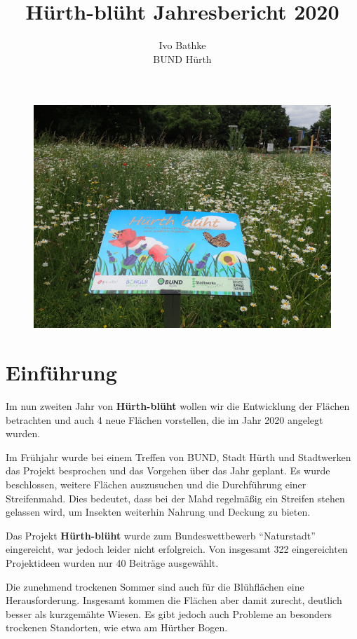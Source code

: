 \documentclass[10pt]{article}
\title{\textbf{Hürth-blüht Jahresbericht 2020}}
\author{Ivo Bathke\\
		BUND Hürth\\}
\date{}
\begin{document}
\maketitle

\begin{figure}[h!]
  \includegraphics[width=\linewidth]{img/titel.jpg}
\end{figure}

\newpage

\section{Einführung}
Im nun zweiten Jahr von \textbf{Hürth-blüht} wollen wir die Entwicklung der Flächen betrachten und auch 4 neue Flächen vorstellen, die im Jahr 2020 angelegt wurden.


Im Frühjahr wurde bei einem Treffen von BUND, Stadt Hürth und Stadtwerken das Projekt besprochen und das Vorgehen über das Jahr geplant. Es wurde beschlossen, weitere Flächen auszusuchen und die Durchführung einer Streifenmahd. Dies bedeutet, dass bei der Mahd regelmäßig ein Streifen stehen gelassen wird, um Insekten weiterhin Nahrung und Deckung zu bieten.

Das Projekt \textbf{Hürth-blüht} wurde zum Bundeswettbewerb "`Naturstadt"' eingereicht, war jedoch leider nicht erfolgreich. Von insgesamt 322 eingereichten Projektideen wurden nur 40 Beiträge ausgewählt.

Die zunehmend trockenen Sommer sind auch für die Blühflächen eine Herausforderung. Insgesamt kommen die Flächen aber damit zurecht, deutlich besser als kurzgemähte Wiesen.
Es gibt jedoch auch Probleme an besonders trockenen Standorten, wie etwa am Hürther Bogen.
\end{document}
